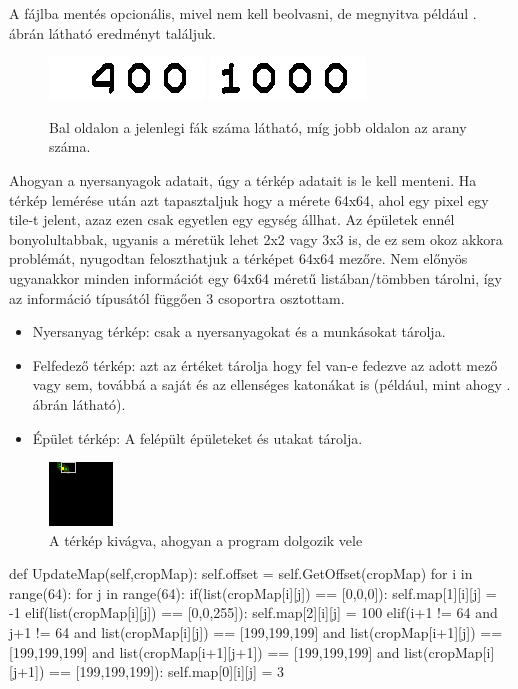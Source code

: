 A fájlba mentés opcionális, mivel nem kell beolvasni, de megnyitva például . ábrán látható eredményt találjuk.

\begin{figure}[h]
    \centering
    \includegraphics[scale=1]{images/Lumber.png}
    \includegraphics[scale=1]{images/Gold.png}
    \caption{Bal oldalon a jelenlegi fák száma látható, míg jobb oldalon az arany száma. }
    \label{fig:numbers}
\end{figure}

Ahogyan a nyersanyagok adatait, úgy a térkép adatait is le kell menteni. Ha térkép lemérése után azt tapasztaljuk hogy a mérete 64x64, ahol egy pixel egy tile-t jelent, azaz ezen csak egyetlen egy egység állhat. Az épületek ennél bonyolultabbak, ugyanis a méretük lehet 2x2 vagy 3x3 is, 
de ez sem okoz akkora problémát, nyugodtan feloszthatjuk a térképet 64x64 mezőre. Nem előnyös ugyanakkor minden információt egy 64x64 méretű listában/tömbben tárolni, így az információ típusától függően 3 csoportra osztottam.
\begin{itemize}
    \item Nyersanyag térkép: csak a nyersanyagokat és a munkásokat tárolja.
    \item Felfedező térkép: azt az értéket tárolja hogy fel van-e fedezve az adott mező vagy sem, továbbá a saját és az ellenséges katonákat is (például, mint ahogy . ábrán látható).
    \item Épület térkép: A felépült épületeket és utakat tárolja.
\end{itemize}


\begin{figure}[h]
    \centering
    \includegraphics[scale=2]{images/map.png}
    \caption{A térkép kivágva, ahogyan a program dolgozik vele}
    \label{fig:map}
\end{figure}

\begin{python}
def UpdateMap(self,cropMap):
    self.offset = self.GetOffset(cropMap)
    for i in range(64):
        for j in range(64):
            if(list(cropMap[i][j]) == [0,0,0]):
                self.map[1][i][j] = -1
            elif(list(cropMap[i][j]) == [0,0,255]):
                self.map[2][i][j] = 100
            elif(i+1 != 64 and j+1 != 64 
            and list(cropMap[i][j]) == [199,199,199] 
            and list(cropMap[i+1][j]) == [199,199,199] 
            and list(cropMap[i+1][j+1]) == [199,199,199] 
            and list(cropMap[i][j+1]) == [199,199,199]):
                self.map[0][i][j] = 3    
\end{python}

